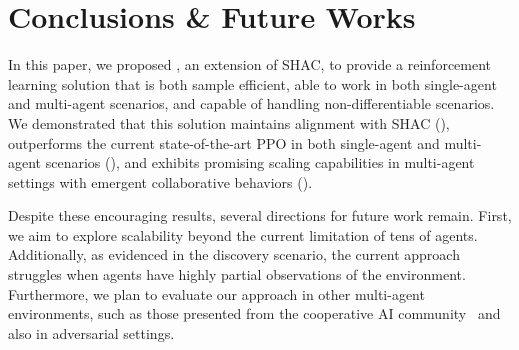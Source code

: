 \section{Conclusions \& Future Works}\label{sect:conclusion}
In this paper, we proposed \fname{}, an extension of SHAC, to provide a reinforcement learning solution that is both sample efficient, able to work in both single-agent and multi-agent scenarios, and capable of handling non-differentiable scenarios. We demonstrated that this solution maintains alignment with SHAC (), outperforms the current state-of-the-art PPO in both single-agent and multi-agent scenarios (), and exhibits promising scaling capabilities in multi-agent settings with emergent collaborative behaviors ().

Despite these encouraging results, several directions for future work remain. First, we aim to explore scalability beyond the current limitation of tens of agents. Additionally, as evidenced in the discovery scenario, the current approach struggles when agents have highly partial observations of the environment. Furthermore, we plan to evaluate our approach in other multi-agent environments, such as those presented from the cooperative AI community~\cite{DBLP:journals/corr/abs-2211-13746} and also in adversarial settings. 
